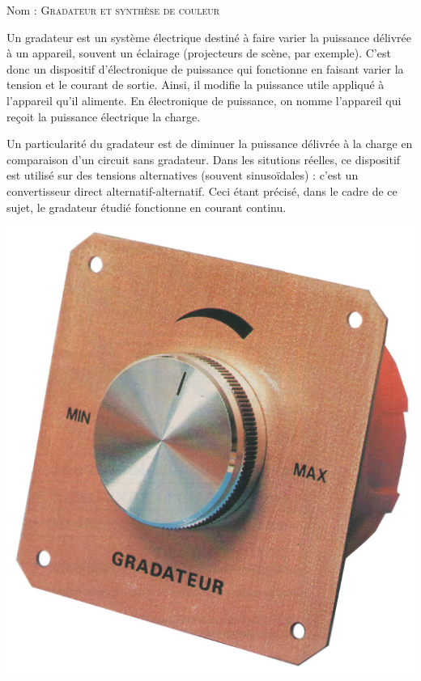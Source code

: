 \documentclass[a4paper, 11pt]{article}           %
\newcommand{\objectif}[1]{\textsc{\Huge #1} }
\begin{document}
\sffamily
\hfill Nom : {\noindent\makebox[5cm]{\dotfill}\endgraf}
\objectif{Gradateur et synthèse de couleur}\\ %

\begin{minipage}{0.46\textwidth}
Un gradateur est un système électrique destiné à faire varier la puissance délivrée à un appareil, souvent un éclairage (projecteurs de scène, par exemple). C'est donc un dispositif d'électronique de puissance qui fonctionne en faisant varier la tension et le courant de sortie. Ainsi, il modifie la puissance utile appliqué à l'appareil qu'il alimente. En électronique de puissance, on nomme l'appareil qui reçoit la puissance électrique la charge.

Un particularité du gradateur est de diminuer la puissance délivrée à la charge en comparaison d'un circuit sans gradateur. Dans les situtions réelles, ce dispositif est utilisé sur des tensions alternatives (souvent sinusoïdales) : c'est un convertisseur direct alternatif-alternatif. Ceci étant précisé, dans le cadre de ce sujet, le gradateur étudié fonctionne en courant continu.\\
\end{minipage}\hfill
\begin{minipage}{0.46\textwidth}
\begin{center}
\includegraphics[width=\textwidth]{Gradateur_lumiere_mural}
\end{center}
\end{minipage}
\end{document}
